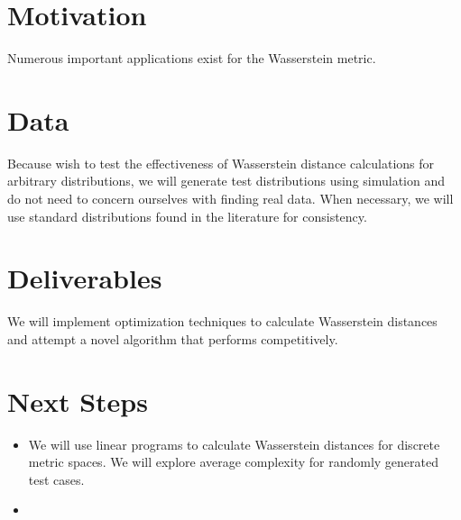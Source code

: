 \documentclass[letter]{amsart}
\begin{document}
\section{Motivation}

Numerous important applications exist for the Wasserstein metric. 

\section{Data}

Because wish to test the effectiveness of Wasserstein distance calculations for
arbitrary distributions, we will generate test distributions using simulation
and do not need to concern ourselves with finding real data. When necessary, we
will use standard distributions found in the literature for consistency.

\section{Deliverables}

We will implement optimization techniques to calculate Wasserstein distances and
attempt a novel algorithm that performs competitively.

\section{Next Steps}

\begin{itemize}

\item We will use linear programs to calculate Wasserstein distances for
discrete metric spaces. We will explore average complexity for randomly
generated test cases.

\item 

\end{itemize}

\end{document}
